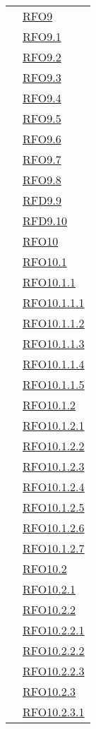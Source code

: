 \begin{longtable}{|>{\centering}m{5cm}|m{5cm}<{\centering}|}
& \hyperlink{RFO9}{RFO9}\\
& \hyperlink{RFO9.1}{RFO9.1}\\
& \hyperlink{RFO9.2}{RFO9.2}\\
& \hyperlink{RFO9.3}{RFO9.3}\\
& \hyperlink{RFO9.4}{RFO9.4}\\
& \hyperlink{RFO9.5}{RFO9.5}\\
& \hyperlink{RFO9.6}{RFO9.6}\\
& \hyperlink{RFO9.7}{RFO9.7}\\
& \hyperlink{RFO9.8}{RFO9.8}\\
& \hyperlink{RFD9.9}{RFD9.9}\\
& \hyperlink{RFD9.10}{RFD9.10}\\
& \hyperlink{RFO10}{RFO10}\\
& \hyperlink{RFO10.1}{RFO10.1}\\
& \hyperlink{RFO10.1.1}{RFO10.1.1}\\
& \hyperlink{RFO10.1.1.1}{RFO10.1.1.1}\\
& \hyperlink{RFO10.1.1.2}{RFO10.1.1.2}\\
& \hyperlink{RFO10.1.1.3}{RFO10.1.1.3}\\
& \hyperlink{RFO10.1.1.4}{RFO10.1.1.4}\\
& \hyperlink{RFO10.1.1.5}{RFO10.1.1.5}\\
& \hyperlink{RFO10.1.2}{RFO10.1.2}\\
& \hyperlink{RFO10.1.2.1}{RFO10.1.2.1}\\
& \hyperlink{RFO10.1.2.2}{RFO10.1.2.2}\\
& \hyperlink{RFO10.1.2.3}{RFO10.1.2.3}\\
& \hyperlink{RFO10.1.2.4}{RFO10.1.2.4}\\
& \hyperlink{RFO10.1.2.5}{RFO10.1.2.5}\\
& \hyperlink{RFO10.1.2.6}{RFO10.1.2.6}\\
& \hyperlink{RFO10.1.2.7}{RFO10.1.2.7}\\
& \hyperlink{RFO10.2}{RFO10.2}\\
& \hyperlink{RFO10.2.1}{RFO10.2.1}\\
& \hyperlink{RFO10.2.2}{RFO10.2.2}\\
& \hyperlink{RFO10.2.2.1}{RFO10.2.2.1}\\
& \hyperlink{RFO10.2.2.2}{RFO10.2.2.2}\\
& \hyperlink{RFO10.2.2.3}{RFO10.2.2.3}\\
& \hyperlink{RFO10.2.3}{RFO10.2.3}\\
& \hyperlink{RFO10.2.3.1}{RFO10.2.3.1}\\

\end{longtable}
